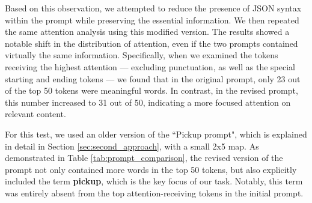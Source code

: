 Based on this observation, we attempted to reduce the presence of JSON syntax within
the prompt while preserving the essential information. We then repeated the same
attention analysis using this modified version. The results showed a notable shift
in the distribution of attention, even if the two prompts contained virtually
the same information. Specifically, when we examined the tokens receiving the
highest attention — excluding punctuation, as well as the special starting and ending
tokens — we found that in the original prompt, only 23 out of the top 50 tokens
were meaningful words. In contrast, in the revised prompt, this number increased
to 31 out of 50, indicating a more focused attention on relevant content.

For this test, we used an older version of the ``Pickup prompt", which is explained
in detail in Section \ref{sec:second_approach}, with a small 2x5 map. As demonstrated
in Table \ref{tab:prompt_comparison}, the revised version of the prompt not only
contained more words in the top 50 tokens, but also explicitly included the term
\textbf{pickup}, which is the key focus of our task. Notably, this term was entirely
absent from the top attention-receiving tokens in the initial prompt.

